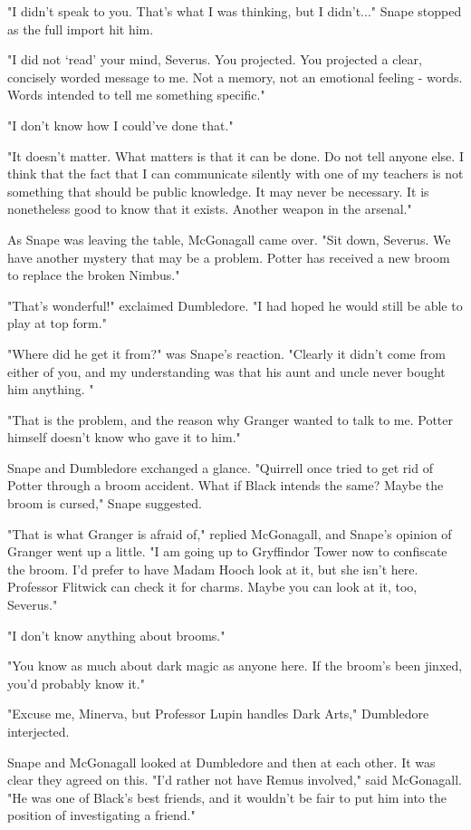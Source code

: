 "I didn't speak to you. That's what I was thinking, but I didn't..." Snape stopped as the full import hit him.

"I did not `read' your mind, Severus. You projected. You projected a clear, concisely worded message to me. Not a memory, not an emotional feeling - words. Words intended to tell me something specific."

"I don't know how I could've done that."

"It doesn't matter. What matters is that it can be done. Do not tell anyone else. I think that the fact that I can communicate silently with one of my teachers is not something that should be public knowledge. It may never be necessary. It is nonetheless good to know that it exists. Another weapon in the arsenal."

As Snape was leaving the table, McGonagall came over. "Sit down, Severus. We have another mystery that may be a problem. Potter has received a new broom to replace the broken Nimbus."

"That's wonderful!" exclaimed Dumbledore. "I had hoped he would still be able to play at top form."

"Where did he get it from?" was Snape's reaction. "Clearly it didn't come from either of you, and my understanding was that his aunt and uncle never bought him anything. "

"That is the problem, and the reason why Granger wanted to talk to me. Potter himself doesn't know who gave it to him."

Snape and Dumbledore exchanged a glance. "Quirrell once tried to get rid of Potter through a broom accident. What if Black intends the same? Maybe the broom is cursed," Snape suggested.

"That is what Granger is afraid of," replied McGonagall, and Snape's opinion of Granger went up a little. "I am going up to Gryffindor Tower now to confiscate the broom. I'd prefer to have Madam Hooch look at it, but she isn't here. Professor Flitwick can check it for charms. Maybe you can look at it, too, Severus."

"I don't know anything about brooms."

"You know as much about dark magic as anyone here. If the broom's been jinxed, you'd probably know it."

"Excuse me, Minerva, but Professor Lupin handles Dark Arts," Dumbledore interjected.

Snape and McGonagall looked at Dumbledore and then at each other. It was clear they agreed on this. "I'd rather not have Remus involved," said McGonagall. "He was one of Black's best friends, and it wouldn't be fair to put him into the position of investigating a friend."

